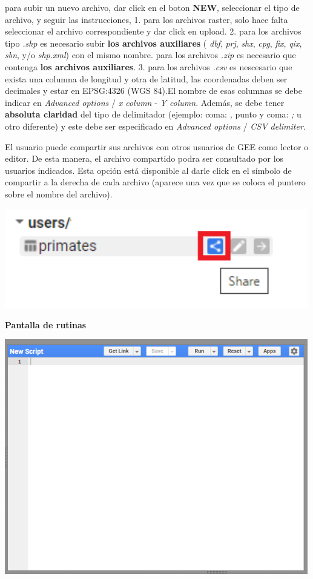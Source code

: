 \documentclass[
]{article}
\begin{document}
para subir un nuevo archivo, dar click en el boton \textbf{NEW},
seleccionar el tipo de archivo, y seguir las instrucciones, 1. para los
archivos raster, solo hace falta seleccionar el archivo correspondiente
y dar click en upload. 2. para los archivos tipo \emph{.shp} es
necesario subir \textbf{los archivos auxiliares} ( \emph{dbf},
\emph{prj}, \emph{shx}, \emph{cpg}, \emph{fix}, \emph{qix}, \emph{sbn},
y/o \emph{shp.xml}) con el mismo nombre. para los archivos \emph{.zip}
es necesario que contenga \textbf{los archivos auxiliares}. 3. para los
archivos \emph{.csv} es nescesario que exista una columna de longitud y
otra de latitud, las coordenadas deben ser decimales y estar en
EPSG:4326 (WGS 84).El nombre de esas columnas se debe indicar en
\emph{Advanced options} / \emph{x column} - \emph{Y column}. Además, se
debe tener \textbf{absoluta claridad} del tipo de delimitador (ejemplo:
coma: \emph{,} punto y coma: \emph{;} u otro diferente) y este debe ser
especificado en \emph{Advanced options} / \emph{CSV delimiter}.

\begin{tipblock}
El usuario puede compartir sus archivos con otros usuarios de GEE como
lector o editor. De esta manera, el archivo compartido podra ser
consultado por los usuarios indicados. Esta opción está disponible al
darle click en el símbolo de compartir a la derecha de cada archivo
(aparece una vez que se coloca el puntero sobre el nombre del archivo).

\includegraphics[width=500px]{Img/shareAssets}

\end{tipblock}

\textbf{Pantalla de rutinas}

\includegraphics[width=500px]{Img/editor}
\end{document}
